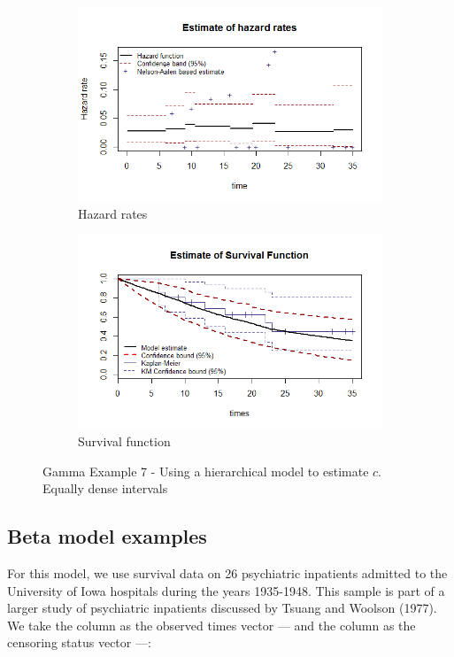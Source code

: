 \documentclass[letterpaper]{article}\usepackage[]{graphicx}\usepackage[]{color}
\begin{document}
\begin{figure}
  \centering
  \begin{subfigure}[a]{\textwidth}\centering
    \includegraphics[width=\textwidth]{G71.png}
    \caption{Hazard rates}
  \end{subfigure}
  \begin{subfigure}[b]{\textwidth}\centering
    \includegraphics[width=\textwidth]{G72.png}
    \caption{Survival function}
  \end{subfigure}
  \caption{Gamma Example 7 - Using a hierarchical model to estimate $c$. Equally dense intervals}
  \label{fig:G7}
\end{figure}


\subsection{Beta model examples}
For this model, we use survival data on 26 psychiatric inpatients admitted to the University of Iowa hospitals during the years 1935-1948. This sample is part of a larger study of psychiatric inpatients discussed by Tsuang and Woolson (1977). We take the  column as the observed times vector ---- and the  column as the censoring status vector ----:
\end{document}
